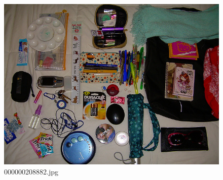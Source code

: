 \begin{figure}[h]
    \centering
    \includegraphics[width=0.8\linewidth]{../image set/hard/000000208882.jpg}
    \caption{000000208882.jpg}
\end{figure}
